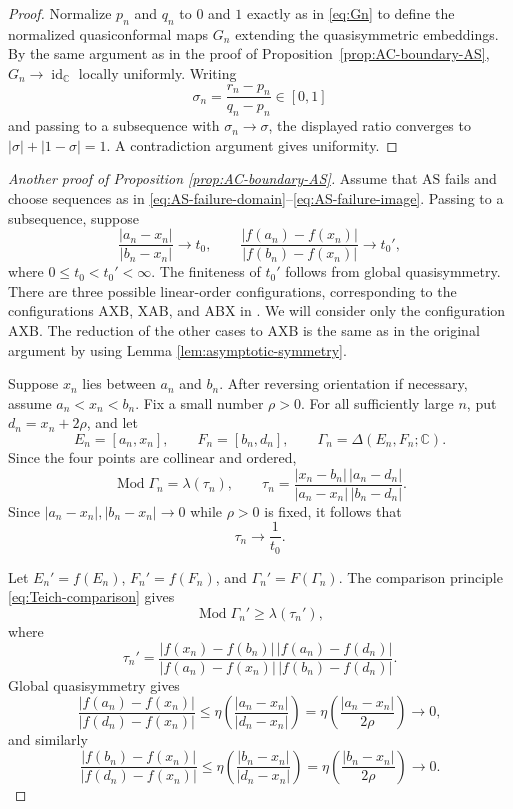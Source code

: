 \documentclass[11pt]{amsart}
\numberwithin{equation}{section}
\theoremstyle{definition} %
\theoremstyle{remarkstyle}
\newcommand{\C}{\mathbb{C}}
\newcommand{\id}{\operatorname{id}}
\newcommand{\Mod}{\operatorname{Mod}}
\begin{document}
\begin{proof}
Normalize $p_n$ and $q_n$ to $0$ and $1$ exactly as in \eqref{eq:Gn} to define the normalized quasiconformal maps $G_n$ extending the quasisymmetric embeddings. 
By the same argument as in the proof of Proposition~\ref{prop:AC-boundary-AS}, $G_n\to \id_{\C}$ 
locally uniformly. 
Writing
\[
 \sigma_n=\frac{r_n-p_n}{q_n-p_n}\in[0,1]
\]
and passing to a subsequence with $\sigma_n\to\sigma$, the displayed ratio converges to $|\sigma|+|1-\sigma|=1$.
A contradiction argument gives uniformity.
\end{proof}
\begin{proof}[Another proof of Proposition \ref{prop:AC-boundary-AS}]
Assume that $\mathrm{AS}$ fails and choose sequences as in \eqref{eq:AS-failure-domain}--\eqref{eq:AS-failure-image}.  
Passing to a subsequence, suppose
\begin{equation}\label{eq:t0-t0prime}
 \frac{|a_n-x_n|}{|b_n-x_n|}\to  t_0,
 \qquad
 \frac{|f(a_n)-f(x_n)|}{|f(b_n)-f(x_n)|}\to  t_0',
\end{equation}
where $0\le t_0<t_0'<\infty$.
The finiteness of $t_0'$ follows from global quasisymmetry. 
There are three possible linear-order configurations, corresponding to the configurations AXB, XAB, and ABX in \cite{BraniaYang}.
We will consider only the configuration AXB. The reduction of the other cases to AXB is
the same as in the original argument by using Lemma \ref{lem:asymptotic-symmetry}.

Suppose $x_n$ lies between $a_n$ and $b_n$.  
After reversing orientation if necessary, assume $a_n<x_n<b_n$. 
Fix a small number $\rho>0$.  
For all sufficiently large $n$, put $d_n=x_n+2\rho$, and let
\[
 E_n=[a_n,x_n],\qquad F_n=[b_n,d_n],\qquad\Gamma_n=\Delta(E_n,F_n;\C).
\]
Since the four points are collinear and ordered,
\begin{equation*}
 \Mod\Gamma_n=\lambda(\tau_n),\qquad\tau_n=\frac{|x_n-b_n|\,|a_n-d_n|}{|a_n-x_n|\,|b_n-d_n|}.
\end{equation*}
Since $|a_n-x_n|,|b_n-x_n|\to0$ while $\rho>0$ is fixed, it follows that
\begin{equation}\label{eq:tau-limit}
 \tau_n\to \frac1{t_0}.
\end{equation}

Let $E_n'=f(E_n)$, $F_n'=f(F_n)$, and $\Gamma_n'=F(\Gamma_n)$.
The comparison principle \eqref{eq:Teich-comparison} gives
\begin{equation}\label{eq:image-lower}
 \Mod\Gamma_n'\ge\lambda(\tau_n'),
\end{equation}
where
\[
 \tau_n'=\frac{|f(x_n)-f(b_n)|\,|f(a_n)-f(d_n)|}{|f(a_n)-f(x_n)|\,|f(b_n)-f(d_n)|}.
\]
Global quasisymmetry gives
\[
 \frac{|f(a_n)-f(x_n)|}{|f(d_n)-f(x_n)|}\leq\eta\!\left(\frac{|a_n-x_n|}{|d_n-x_n|}\right)=\eta\!\left(\frac{|a_n-x_n|}{2\rho}\right)\to 0,
\]
and similarly
\[
 \frac{|f(b_n)-f(x_n)|}{|f(d_n)-f(x_n)|}\leq\eta\!\left(\frac{|b_n-x_n|}{|d_n-x_n|}\right)=\eta\!\left(\frac{|b_n-x_n|}{2\rho}\right)\to 0.
\]


\end{proof}
\end{document}
